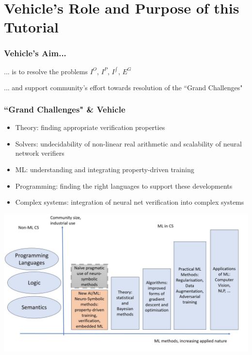 \documentclass{beamer}
\begin{document}
\section{Vehicle's Role and Purpose of this Tutorial}

\begin{frame}
\frametitle{\textbf{Vehicle}'s Aim...}

\alert{... is to resolve the problems $I^O$, $I^P$, $I^{\int}$, $E^G$}
\pause

... and support community's effort towards resolution of the ``Grand Challenges"

\end{frame}

  \begin{frame}
  \frametitle{``Grand Challenges"  \& \textbf{Vehicle}}
  \footnotesize{
  \begin{itemize}
  \item Theory: finding appropriate verification properties
\item  Solvers: undecidability of non-linear real arithmetic  and scalability of neural network verifiers
\item \alert{ML: understanding and integrating property-driven training}
\item \alert{Programming: finding the right languages to support these developments}
\item \alert{Complex systems: integration of neural net verification into complex systems}
  \end{itemize}}

  \begin{center}
  \includegraphics[scale=.20]{Images/Slide1.jpg}
  \end{center}
\end{frame}
\end{document}
